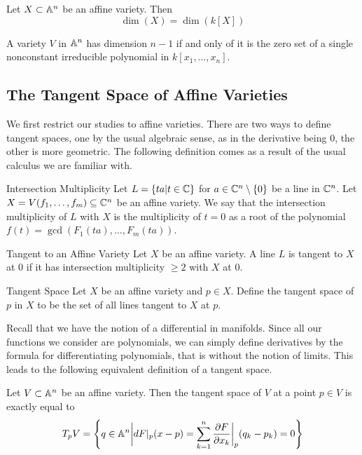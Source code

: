 \documentclass[a4paper]{article}
\begin{document}
\begin{thm}{}{} Let $X\subset\mathbb{A}^n$ be an affine variety. Then $$\dim(X)=\dim(k[X])$$
\end{thm}

\begin{prp}{}{} A variety $V$ in $\mathbb{A}^n$ has dimension $n-1$ if and only of it is the zero set of a single nonconstant irreducible polynomial in $k[x_1,\dots,x_n]$. 
\end{prp}

\subsection{The Tangent Space of Affine Varieties}
We first restrict our studies to affine varieties. There are two ways to define tangent spaces, one by the usual algebraic sense, as in the derivative being $0$, the other is more geometric. The following definition comes as a result of the usual calculus we are familiar with. 

\begin{defn}{Intersection Multiplicity}{} Let $L=\{ta|t\in\mathbb{C}\}$ for $a\in\mathbb{C}^n\setminus\{0\}$ be a line in $\mathbb{C}^n$. Let $X=V(f_1,\dots,f_m)\subseteq\mathbb{C}^n$ be an affine variety. We say that the intersection multiplicity of $L$ with $X$ is the multiplicity of $t=0$ as a root of the polynomial $f(t)=\gcd(F_1(ta),\dots,F_m(ta))$. 
\end{defn}

\begin{defn}{Tangent to an Affine Variety}{} Let $X$ be an affine variety. A line $L$ is tangent to $X$ at $0$ if it has intersection multiplicity $\geq 2$ with $X$ at $0$. 
\end{defn}

\begin{defn}{Tangent Space}{} Let $X$ be an affine variety and $p\in X$. Define the tangent space of $p$ in $X$ to be the set of all lines tangent to $X$ at $p$. 
\end{defn}

Recall that we have the notion of a differential in manifolds. Since all our functions we consider are polynomials, we can simply define derivatives by the formula for differentiating polynomials, that is without the notion of limits. This leads to the following equivalent definition of a tangent space. 

\begin{prp}{}{} Let $V\subset\mathbb{A}^n$ be an affine variety. Then the tangent space of $V$ at a point $p\in V$ is exactly equal to $$T_pV=\left\{q\in\mathbb{A}^n\bigg{|}dF|_p(x-p)=\sum_{k=1}^n\frac{\partial F}{\partial x_k}\bigg{|}_p(q_k-p_k)=0\right\}$$
\end{prp}
\end{document}
